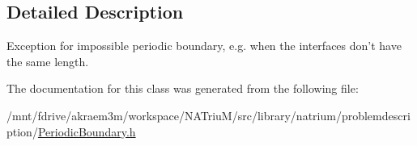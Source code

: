 \subsection{Detailed Description}
Exception for impossible periodic boundary, e.g. when the interfaces don't have the same length. 

The documentation for this class was generated from the following file:\begin{DoxyCompactItemize}
\item 
/mnt/fdrive/akraem3m/workspace/NATriuM/src/library/natrium/problemdescription/\hyperlink{PeriodicBoundary_8h}{PeriodicBoundary.h}\end{DoxyCompactItemize}
